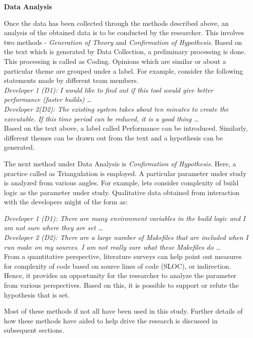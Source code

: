 \documentclass[12pt, a4paper, titlepage]{scrartcl}
\newcommand{\courierword}[1]{\textsf{\itshape #1}}{\fontfamily{pcr}\selectfont}%
\begin{document}
\par \textbf{Data Analysis}
\par Once the data has been collected through the methods described above, an analysis of the obtained data is to be conducted by the researcher. This involves two methods - \textit{Generation of Theory} and \textit{Confirmation of Hypothesis}. Based on the text which is generated by Data Collection, a preliminary processing is done. This processing is called as Coding\cite{wagner2016analysing}. Opinions which are similar or about a particular theme are grouped under a label. For example, consider the following statements made by different team members.\\

\textit{Developer 1 (D1): I would like to find out if this tool would give better performance (faster builds) \ldots \\
Developer 2(D2): The existing system takes about ten minutes to create the executable. If this time period can be reduced, it is a good thing \ldots} \\

Based on the text above, a label called Performance can be introduced. Similarly, different themes can be drawn out from the text and a hypothesis can be generated. 
\par The next method under Data Analysis is \textit{Confirmation of Hypothesis}. Here, a practice called as Triangulation\cite{seaman2009using} is employed. A particular parameter under study is analyzed from various angles. For example, lets consider complexity of build logic as the parameter under study. Qualitative data obtained from interaction with the developers might of the form as: 

\textit{Developer 1 (D1): There are many environment variables in the build logic and I am not sure where they are set \ldots \\
Developer 2 (D2): There are a large number of Makefiles that are included when I run \courierword{make} on my sources. I am not really sure what these Makefiles do \ldots } \\

From a quantitative perspective, literature surveys can help point out measures for complexity of code based on source lines of code (SLOC), or indirection. Hence, it provides an opportunity for the researcher to analyze the parameter from various perspectives. Based on this, it is possible to support or refute the hypothesis that is set. 

\par Most of these methods if not all have been used in this study. Further details of how these methods have aided to help drive the research is discussed in subsequent sections.  
\end{document}
